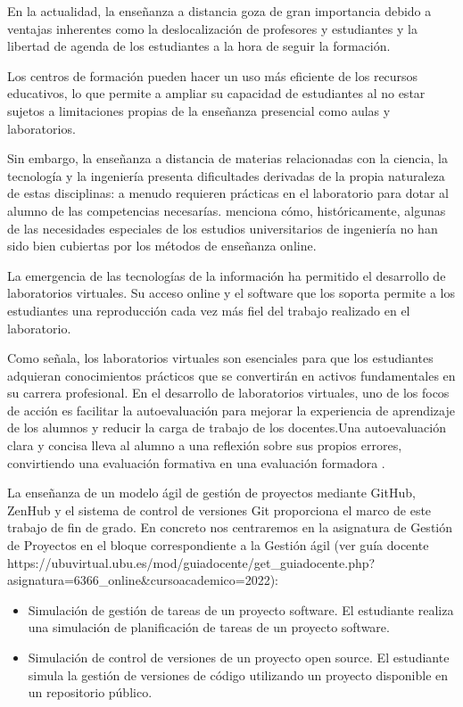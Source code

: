 
En la actualidad, la enseñanza a distancia goza de gran importancia debido a ventajas inherentes como la deslocalización de profesores y estudiantes y la  libertad de agenda de los estudiantes a la hora de seguir la formación.

Los centros de formación pueden  hacer un  uso más eficiente de los recursos educativos, lo que permite a ampliar su capacidad de estudiantes al no estar sujetos a limitaciones propias de la enseñanza presencial como aulas y laboratorios.

Sin embargo, la enseñanza a distancia de materias relacionadas con la ciencia, la tecnología y  la ingeniería  presenta dificultades derivadas de la propia naturaleza de estas disciplinas: a menudo requieren prácticas en el laboratorio para dotar al alumno de las competencias necesarías. \cite{bourne2019} menciona  cómo, históricamente, algunas de las necesidades especiales de los estudios universitarios de ingeniería no han sido bien cubiertas por los métodos de enseñanza online.

La emergencia de las tecnologías de la información ha permitido el desarrollo de laboratorios virtuales. Su acceso online y el software que los soporta permite a los estudiantes una reproducción cada vez más fiel del trabajo realizado en el laboratorio.

Como \cite{tejado2018}  señala, los laboratorios virtuales son esenciales para que los estudiantes adquieran conocimientos prácticos que se convertirán en  activos fundamentales en su  carrera profesional. En el desarrollo de laboratorios virtuales, uno de los focos de acción es facilitar la autoevaluación para mejorar la experiencia de aprendizaje de los alumnos y reducir la carga de trabajo de los docentes.Una autoevaluación clara y concisa lleva al alumno a una reflexión sobre sus propios errores, convirtiendo una evaluación formativa en una evaluación formadora \cite{sánchez2009}.

La enseñanza de un modelo ágil de gestión de proyectos mediante GitHub, ZenHub  y el sistema de control de versiones Git proporciona el marco de este trabajo de fin de grado. En concreto nos centraremos en la asignatura de Gestión de Proyectos en el bloque correspondiente a la Gestión ágil (ver guía docente https://ubuvirtual.ubu.es/mod/guiadocente/get_guiadocente.php?asignatura=6366_online&cursoacademico=2022):

\begin{itemize}
	\item Simulación de gestión de tareas de un proyecto software. El estudiante realiza una simulación de planificación de tareas de un proyecto software.
	\item Simulación de control de versiones de un proyecto open source. El estudiante simula la gestión de versiones de código utilizando un proyecto disponible en un repositorio público.
\end{itemize}

